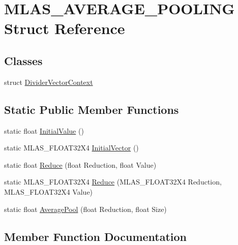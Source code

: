 \hypertarget{structMLAS__AVERAGE__POOLING}{}\section{M\+L\+A\+S\+\_\+\+A\+V\+E\+R\+A\+G\+E\+\_\+\+P\+O\+O\+L\+I\+NG Struct Reference}
\label{structMLAS__AVERAGE__POOLING}
\subsection*{Classes}
\begin{DoxyCompactItemize}
\item 
struct \mbox{\hyperlink{structMLAS__AVERAGE__POOLING_1_1DividerVectorContext}{Divider\+Vector\+Context}}
\end{DoxyCompactItemize}
\subsection*{Static Public Member Functions}
\begin{DoxyCompactItemize}
\item 
static float \mbox{\hyperlink{structMLAS__AVERAGE__POOLING_afdb58cfb14fc46c9ba0c7f797f4afae8}{Initial\+Value}} ()
\item 
static M\+L\+A\+S\+\_\+\+F\+L\+O\+A\+T32\+X4 \mbox{\hyperlink{structMLAS__AVERAGE__POOLING_a8278e98e9c92456342b5fca911a71406}{Initial\+Vector}} ()
\item 
static float \mbox{\hyperlink{structMLAS__AVERAGE__POOLING_ab28c2e9b1620852f245100b1c5debb70}{Reduce}} (float Reduction, float Value)
\item 
static M\+L\+A\+S\+\_\+\+F\+L\+O\+A\+T32\+X4 \mbox{\hyperlink{structMLAS__AVERAGE__POOLING_ad1bbff4d5c0f4e28e14a8eca40ec53cf}{Reduce}} (M\+L\+A\+S\+\_\+\+F\+L\+O\+A\+T32\+X4 Reduction, M\+L\+A\+S\+\_\+\+F\+L\+O\+A\+T32\+X4 Value)
\item 
static float \mbox{\hyperlink{structMLAS__AVERAGE__POOLING_a92a03087abc03313ab1f4c52338bb6a4}{Average\+Pool}} (float Reduction, float Size)
\end{DoxyCompactItemize}


\subsection{Member Function Documentation}
\mbox{\label{structMLAS__AVERAGE__POOLING_a92a03087abc03313ab1f4c52338bb6a4}} 
